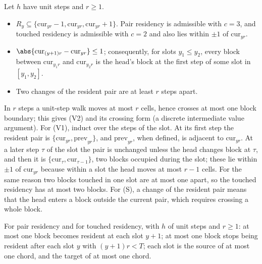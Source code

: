 \begin{lemma}[Residency]\label{lem:residency}
Let $h$ have unit steps and $r\ge1$.
\begin{itemize}[leftmargin=3em]
\item[(V1)] $R_y\subseteq\{\mathrm{cur}_{yr}-1,\mathrm{cur}_{yr},\mathrm{cur}_{yr}+1\}$. Pair residency
is admissible with $c=3$, and touched residency is admissible with $c=2$ and also lies within
$\pm1$ of $\mathrm{cur}_{yr}$.
\item[(V2)] $\abs{\mathrm{cur}_{(y+1)r}-\mathrm{cur}_{yr}}\le1$; consequently, for slots
$y_1\le y_2$, every block between $\mathrm{cur}_{y_1r}$ and $\mathrm{cur}_{y_2r}$ is the head's
block at the first step of some slot in $[y_1,y_2]$.
\item[(S)] Two changes of the resident pair are at least $r$ steps apart.
\end{itemize}
\end{lemma}

\begin{outline}
In $r$ steps a unit-step walk moves at most $r$ cells, hence crosses at most one block
boundary; this gives (V2) and its crossing form (a discrete intermediate value argument). For (V1), induct over the steps of the slot. At its first step the resident pair is
$\{\mathrm{cur}_{yr},\mathrm{prev}_{yr}\}$, and $\mathrm{prev}_{yr}$, when defined, is adjacent to
$\mathrm{cur}_{yr}$. At a later step $\tau$ of the slot the pair is unchanged unless the head changes
block at $\tau$, and then it is $\{\mathrm{cur}_\tau,\mathrm{cur}_{\tau-1}\}$, two blocks occupied
during the slot; these lie within $\pm1$ of $\mathrm{cur}_{yr}$ because within a slot the head moves
at most $r-1$ cells. For the same reason two blocks touched in one slot are at most one apart, so the
touched residency has at most two blocks. For (S), a change of the resident pair means that the head
enters a block outside the current pair, which requires crossing a whole block.
\end{outline}

\begin{lemma}\label{lem:P2}
For pair residency and for touched residency, with $h$ of unit steps and $r\ge1$:
at most one block becomes resident at each slot $y+1$; at most one block stops being resident
after each slot $y$ with $(y+1)r<T$; each slot is the source of at most one chord, and the target
of at most one chord.
\end{lemma}

